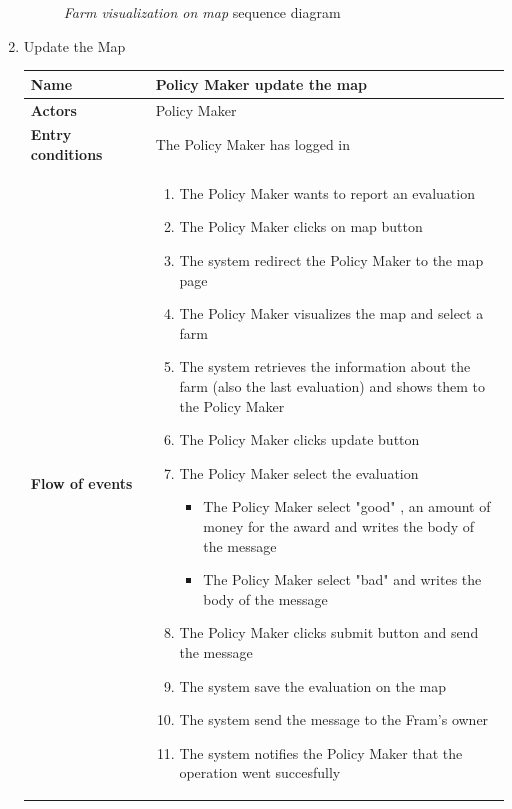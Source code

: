 \begin{enumerate}
\begin{figure}[H]
\begin{center}
        \caption{\emph{Farm visualization on map} sequence diagram}
        \label{fig:sequence11}
        \end{center}
    \end{figure}

    \item Update the Map
    \begin{longtable}{p{0.26\linewidth}p{0.75\linewidth}}
        \toprule
        \textbf{Name} & \textbf{Policy Maker update the map} \\
        \midrule
        \textbf{Actors} & Policy Maker \\
        \midrule
        \textbf{Entry conditions} & The Policy Maker has logged in\\
        \midrule
        \textbf{Flow of events} & 
        \begin{enumerate}
            \item The Policy Maker wants to report an evaluation
            \item The Policy Maker clicks on map button
            \item The system redirect the Policy Maker to the map page
            \item The Policy Maker visualizes the map and select a farm
            \item The system retrieves the information about the farm (also the last evaluation) and shows them to the Policy Maker
            \item The Policy Maker clicks update button
            \item The Policy Maker select the evaluation
                \begin{itemize}
                    \item The Policy Maker select "good" , an amount of money for the award and writes the body of the message
                    \item The Policy Maker select "bad" and writes the body of the message
                \end{itemize}
            \item The Policy Maker clicks submit button and send the message
            \item The system save the evaluation on the map
            \item The system send the message to the Fram's owner
            \item The system notifies the Policy Maker that the operation went succesfully 
        \end{enumerate} \\

\end{longtable}
\end{enumerate}
